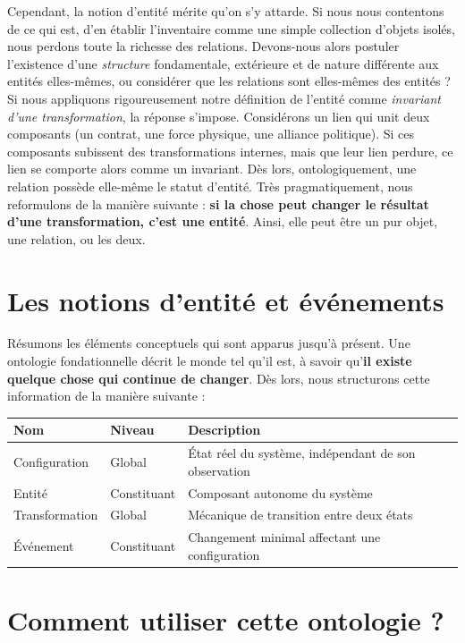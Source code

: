 \documentclass{report}
\begin{document}
	
	Cependant, la notion d'entité mérite qu'on s'y attarde. Si nous nous contentons de ce qui est, d'en établir l'inventaire comme une simple collection d'objets isolés, nous perdons toute la richesse des relations. Devons-nous alors postuler l'existence d'une \textit{structure} fondamentale, extérieure et de nature différente aux entités elles-mêmes, ou considérer que les relations sont elles-mêmes des entités ? Si nous appliquons rigoureusement notre définition de l'entité comme \textit{invariant d'une transformation}, la réponse s'impose. Considérons un lien qui unit deux composants (un contrat, une force physique, une alliance politique). Si ces composants subissent des transformations internes, mais que leur lien perdure, ce lien se comporte alors comme un invariant. Dès lors, ontologiquement, une relation possède elle-même le statut d'entité. Très pragmatiquement, nous reformulons de la manière suivante : \textbf{si la chose peut changer le résultat d'une transformation, c'est une entité}. Ainsi, elle peut être un pur objet, une relation, ou les deux. 
	
	\section{Les notions d'entité et événements}
	
	Résumons les éléments conceptuels qui sont apparus jusqu'à présent. Une ontologie fondationnelle décrit le monde tel qu'il est, à savoir qu'\textbf{il existe quelque chose qui continue de changer}. Dès lors, nous structurons cette information de la manière suivante : 
	
	\begin{table}[H]
		\centering
		\begin{tabular}{|l|l|l|}
			\hline 
			\textbf{Nom} & \textbf{Niveau} & \textbf{Description} \\
			\hline 
			Configuration & Global & État réel du système, indépendant de son observation \\
			\hline 
			Entité & Constituant & Composant autonome du système \\
			\hline 
			Transformation & Global & Mécanique de transition entre deux états \\
			\hline 
			Événement & Constituant & Changement minimal affectant une configuration \\
			\hline 
		\end{tabular}
	\end{table}
	
	
	\section{Comment utiliser cette ontologie ?} 
\end{document}
